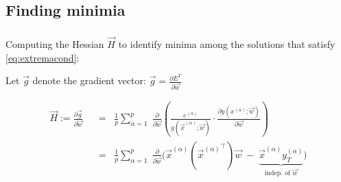 \subsection{Finding minimia}

\begin{frame}\frametitle{\subsecname}

Computing the Hessian $\vec H$ to identify minima among the solutions that satisfy \eqref{eq:extremacond}:

Let $\vec g$ denote the gradient vector: $\vec g = \frac{\partial E^{T}}{\partial \vec w}$

\begin{align}
\vec H := \frac{\partial \vec g}{\partial \vec w}
\;\;&=\;\;
\frac{1}{p} \sum_{\alpha=1}^{p} \;
\frac{\partial}{\partial \vec w}
\left(
\frac{e^{(\alpha)}}{y(\vec x^{(\alpha)}; \vec w)}
\cdot
\frac{\partial y(x^{(\alpha)};\vec w)}{\partial \vec w} 
\right)\\
\;\;&=\;\;
\frac{1}{p} \sum_{\alpha=1}^{p} \;
\frac{\partial}{\partial \vec w}
\Big( 
\vec x^{(\alpha)}
\left({\vec x^{(\alpha)}}^{\top}\right) \vec w 
\;-\; 
\underbrace{
\vec x^{(\alpha)}
y_{T}^{(\alpha)} 
}_{\text{indep. of }\vec w}
\Big)\\
\end{align}

\end{frame}
